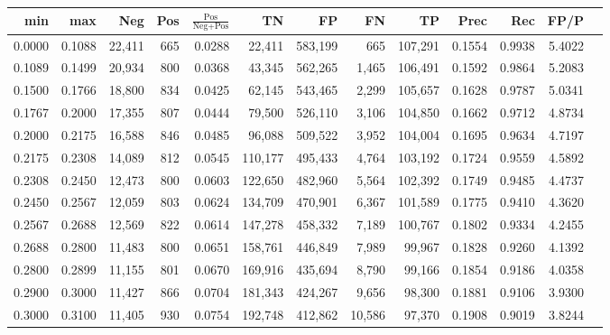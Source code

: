 \begin{tabular}{rrrrrrrrrrrrr}
\toprule
   min &    max &    Neg &   Pos & $\frac{\text{Pos}}{\text{Neg}+\text{Pos}}$ &      TN &      FP &      FN &      TP &   Prec &    Rec &   FP/P \\
\midrule
0.0000 & 0.1088 & 22,411 &   665 &                                     0.0288 &  22,411 & 583,199 &     665 & 107,291 & 0.1554 & 0.9938 & 5.4022 \\
0.1089 & 0.1499 & 20,934 &   800 &                                     0.0368 &  43,345 & 562,265 &   1,465 & 106,491 & 0.1592 & 0.9864 & 5.2083 \\
0.1500 & 0.1766 & 18,800 &   834 &                                     0.0425 &  62,145 & 543,465 &   2,299 & 105,657 & 0.1628 & 0.9787 & 5.0341 \\
0.1767 & 0.2000 & 17,355 &   807 &                                     0.0444 &  79,500 & 526,110 &   3,106 & 104,850 & 0.1662 & 0.9712 & 4.8734 \\
0.2000 & 0.2175 & 16,588 &   846 &                                     0.0485 &  96,088 & 509,522 &   3,952 & 104,004 & 0.1695 & 0.9634 & 4.7197 \\
0.2175 & 0.2308 & 14,089 &   812 &                                     0.0545 & 110,177 & 495,433 &   4,764 & 103,192 & 0.1724 & 0.9559 & 4.5892 \\
0.2308 & 0.2450 & 12,473 &   800 &                                     0.0603 & 122,650 & 482,960 &   5,564 & 102,392 & 0.1749 & 0.9485 & 4.4737 \\
0.2450 & 0.2567 & 12,059 &   803 &                                     0.0624 & 134,709 & 470,901 &   6,367 & 101,589 & 0.1775 & 0.9410 & 4.3620 \\
0.2567 & 0.2688 & 12,569 &   822 &                                     0.0614 & 147,278 & 458,332 &   7,189 & 100,767 & 0.1802 & 0.9334 & 4.2455 \\
0.2688 & 0.2800 & 11,483 &   800 &                                     0.0651 & 158,761 & 446,849 &   7,989 &  99,967 & 0.1828 & 0.9260 & 4.1392 \\
0.2800 & 0.2899 & 11,155 &   801 &                                     0.0670 & 169,916 & 435,694 &   8,790 &  99,166 & 0.1854 & 0.9186 & 4.0358 \\
0.2900 & 0.3000 & 11,427 &   866 &                                     0.0704 & 181,343 & 424,267 &   9,656 &  98,300 & 0.1881 & 0.9106 & 3.9300 \\
0.3000 & 0.3100 & 11,405 &   930 &                                     0.0754 & 192,748 & 412,862 &  10,586 &  97,370 & 0.1908 & 0.9019 & 3.8244 \\

\end{tabular}
